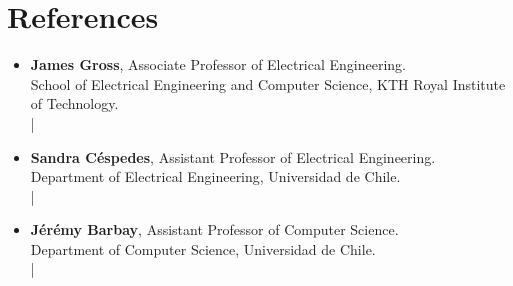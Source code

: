 \documentclass[letterpaper,10pt]{article}
\begin{document}
\section{References}
\begin{itemize}[leftmargin=*]
  \item \textbf{James Gross}, Associate Professor of Electrical Engineering.\\
  School of Electrical Engineering and Computer Science, KTH Royal Institute of Technology.\\
   | \\

  \item \textbf{Sandra Céspedes}, Assistant Professor of Electrical Engineering.\\
  Department of Electrical Engineering, Universidad de Chile.\\
   | \\

  \item \textbf{Jérémy Barbay}, Assistant Professor of Computer Science.\\
  Department of Computer Science, Universidad de Chile.\\
   | \\
\end{itemize}

%


\end{document}
